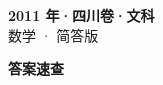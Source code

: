 \documentclass[zihao=-4, a4paper]{ctexart}
\begin{document}
\begin{center}
  {\Large\bfseries 2011 年·四川卷·文科}\\[4pt]
  {\large 数学 · 简答版}
\end{center}
\medskip
{}

\clearpage
{}
\begin{center}{\Large\bfseries 答案速查}\end{center}
\medskip

\end{document}
